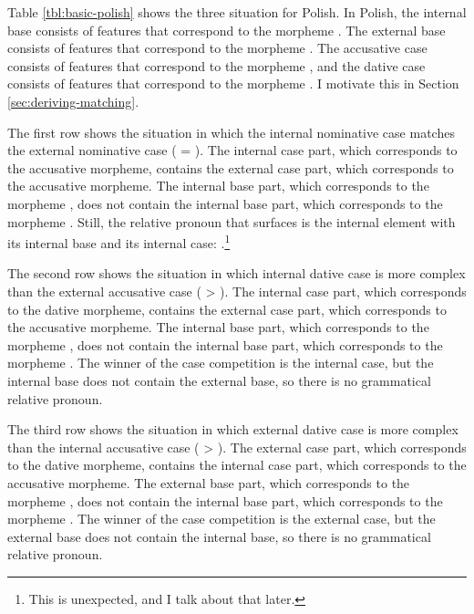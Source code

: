 Table \ref{tbl:basic-polish} shows the three situation for Polish. In Polish, the internal base consists of features that correspond to the morpheme . The external base consists of features that correspond to the morpheme .
The accusative case consists of features that correspond to the morpheme , and the dative case consists of features that correspond to the morpheme .
I motivate this in Section \ref{sec:deriving-matching}.

The first row shows the situation in which the internal nominative case matches the external nominative case ( = ). The internal case part, which corresponds to the accusative  morpheme, contains the external case part, which corresponds to the accusative  morpheme. The internal base part, which corresponds to the morpheme , does not contain the internal base part, which corresponds to the morpheme . Still, the relative pronoun that surfaces is the internal element with its internal base and its internal case: .\footnote{
This is unexpected, and I talk about that later.
}

The second row shows the situation in which internal dative case is more complex than the external accusative case ( > ). The internal case part, which corresponds to the dative  morpheme, contains the external case part, which corresponds to the accusative  morpheme. The internal base part, which corresponds to the morpheme , does not contain the internal base part, which corresponds to the morpheme . The winner of the case competition is the internal case, but the internal base does not contain the external base, so there is no grammatical relative pronoun.

The third row shows the situation in which external dative case is more complex than the internal accusative case ( > ). The external case part, which corresponds to the dative  morpheme, contains the internal case part, which corresponds to the accusative  morpheme. The external base part, which corresponds to the morpheme , does not contain the internal base part, which corresponds to the morpheme . The winner of the case competition is the external case, but the external base does not contain the internal base, so there is no grammatical relative pronoun.

